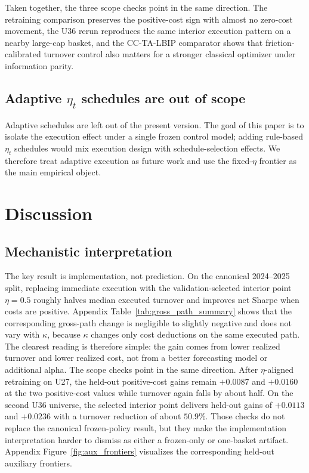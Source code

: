 \documentclass[10pt,twocolumn]{article}
\begin{document}
Taken together, the three scope checks point in the same direction. The retraining comparison preserves the positive-cost sign with almost no zero-cost movement, the U36 rerun reproduces the same interior execution pattern on a nearby large-cap basket, and the CC-TA-LBIP comparator shows that friction-calibrated turnover control also matters for a stronger classical optimizer under information parity.

\subsection{Adaptive \texorpdfstring{$\eta_t$}{eta-t} schedules are out of scope}
Adaptive schedules are left out of the present version. The goal of this paper is to isolate the execution effect under a single frozen control model; adding rule-based $\eta_t$ schedules would mix execution design with schedule-selection effects. We therefore treat adaptive execution as future work and use the fixed-$\eta$ frontier as the main empirical object.

\section{Discussion}
\subsection{Mechanistic interpretation}
The key result is implementation, not prediction. On the canonical 2024--2025 split, replacing immediate execution with the validation-selected interior point $\eta=0.5$ roughly halves median executed turnover and improves net Sharpe when costs are positive. Appendix Table~\ref{tab:gross_path_summary} shows that the corresponding gross-path change is negligible to slightly negative and does not vary with $\kappa$, because $\kappa$ changes only cost deductions on the same executed path. The clearest reading is therefore simple: the gain comes from lower realized turnover and lower realized cost, not from a better forecasting model or additional alpha. The scope checks point in the same direction. After $\eta$-aligned retraining on U27, the held-out positive-cost gains remain $+0.0087$ and $+0.0160$ at the two positive-cost values while turnover again falls by about half. On the second U36 universe, the selected interior point delivers held-out gains of $+0.0113$ and $+0.0236$ with a turnover reduction of about $50.9\%$. Those checks do not replace the canonical frozen-policy result, but they make the implementation interpretation harder to dismiss as either a frozen-only or one-basket artifact. Appendix Figure~\ref{fig:aux_frontiers} visualizes the corresponding held-out auxiliary frontiers.
\end{document}

